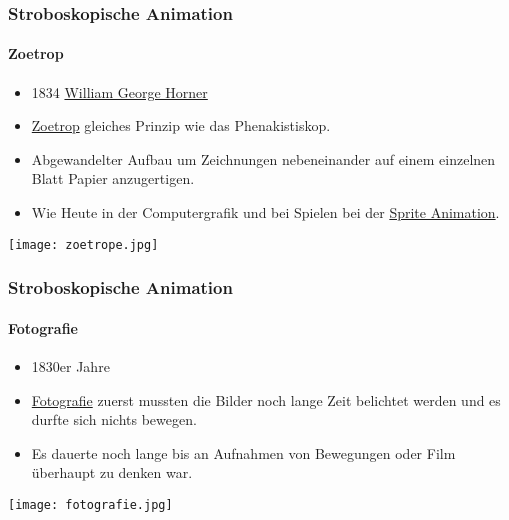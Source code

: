 \begin{frame}
    \frametitle{Stroboskopische Animation}
    \framesubtitle{Zoetrop}
    \begin{minipage}{0.5\textwidth}
        \begin{itemize}
            \item 1834 \href{https://de.wikipedia.org/wiki/William_George_Horner}{William George Horner}
            \item \href{https://de.wikipedia.org/wiki/Zoetrop}{Zoetrop} gleiches Prinzip wie das Phenakistiskop.
            \item Abgewandelter Aufbau um Zeichnungen nebeneinander auf einem einzelnen Blatt Papier anzugertigen.
            \item Wie Heute in der Computergrafik und bei Spielen bei der \href{https://de.wikipedia.org/wiki/Sprite_(Computergrafik)\#Spriteanimation}{Sprite Animation}.
        \end{itemize}
    \end{minipage} \hfill
    \begin{minipage}{0.45\textwidth}
        \texttt{[image: zoetrope.jpg]}
    \end{minipage}
\end{frame}

\begin{frame}
    \frametitle{Stroboskopische Animation}
    \framesubtitle{Fotografie}
    \begin{minipage}{0.5\textwidth}
        \begin{itemize}
            \item 1830er Jahre
            \item \href{https://de.wikipedia.org/wiki/Fotografie}{Fotografie} zuerst mussten die Bilder noch lange Zeit belichtet werden und es durfte sich nichts bewegen.
            \item Es dauerte noch lange bis an Aufnahmen von Bewegungen oder Film überhaupt zu denken war.
        \end{itemize}
    \end{minipage} \hfill
    \begin{minipage}{0.45\textwidth}
        \texttt{[image: fotografie.jpg]}
    \end{minipage}
\end{frame}

